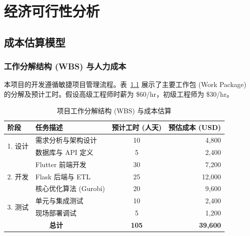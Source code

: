 \chapter{经济可行性分析}

\section{成本估算模型}

\subsection{工作分解结构 (WBS) 与人力成本}
本项目的开发遵循敏捷项目管理流程。表~\ref{tab:wbs} 展示了主要工作包 (Work Package) 的分解及预计工时。假设高级工程师时薪为 \$60/hr，初级工程师为 \$30/hr。

\begin{table}[htbp]
    \centering
    \caption{项目工作分解结构 (WBS) 与成本估算}
    \label{tab:wbs}
    \begin{tabular}{|l|l|c|r|}
        \hline
        \textbf{阶段}                       & \textbf{任务描述}   & \textbf{预计工时 (人天)} & \textbf{预估成本 (USD)} \\ \hline
        \multirow{2}{*}{1. 设计}            & 需求分析与架构设计       & 10                 & 4,800               \\
                                          & 数据库与 API 定义     & 5                  & 2,400               \\ \hline
        \multirow{3}{*}{2. 开发}            & Flutter 前端开发    & 30                 & 7,200               \\
                                          & Flask 后端与 ETL   & 25                 & 12,000              \\
                                          & 核心优化算法 (Gurobi) & 20                 & 9,600               \\ \hline
        \multirow{2}{*}{3. 测试}            & 单元与集成测试         & 10                 & 2,400               \\
                                          & 现场部署调试          & 5                  & 1,200               \\ \hline
        \multicolumn{2}{|c|}{\textbf{总计}} & \textbf{105}    & \textbf{39,600}                          \\ \hline
    \end{tabular}
\end{table}

